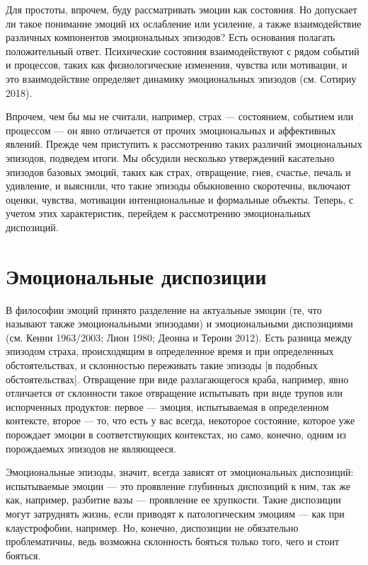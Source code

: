 \documentclass[11pt]{book}
\begin{document}
Для простоты, впрочем, буду рассматривать эмоции как состояния. Но допускает ли такое понимание эмоций их ослабление или усиление, а также взаимодействие различных компонентов эмоциональных эпизодов? Есть основания полагать положительный ответ. Психические состояния взаимодействуют с рядом событий и процессов, таких как физиологические изменения, чувства или мотивации, и это взаимодействие определяет динамику эмоциональных эпизодов (см. Сотириу 2018).

Впрочем, чем бы мы не считали, например, страх --- состоянием, событием или процессом --- он явно отличается от прочих эмоциональных и аффективных явлений. Прежде чем приступить к рассмотрению таких различий эмоциональных эпизодов, подведем итоги. Мы обсудили несколько утверждений касательно эпизодов базовых эмоций, таких как страх, отвращение, гнев, счастье, печаль и удивление, и выяснили, что такие эпизоды обыкновенно скоротечны, включают оценки, чувства, мотивации интенциональные и формальные объекты. Теперь, с учетом этих характеристик, перейдем к рассмотрению эмоциональных диспозиций.

\section{Эмоциональные диспозиции}

В философии эмоций принято разделение на актуальные эмоции (те, что называют также эмоциональными эпизодами) и эмоциональными диспозициями (см. Кенни 1963/2003; Лион 1980; Деонна и Терони 2012). Есть разница между эпизодом страха, происходящим в определенное время и при определенных обстоятельствах, и склонностью переживать такие эпизоды [в подобных обстоятельствах]. Отвращение при виде разлагающегося краба, например, явно отличается от склонности такое отвращение испытывать при виде трупов или испорченных продуктов: первое --- эмоция, испытываемая в определенном контексте, второе --- то, что есть у вас всегда, некоторое состояние, которое уже порождает эмоции в соответствующих контекстах, но само, конечно, одним из порождаемых эпизодов не являющееся.

Эмоциональные эпизоды, значит, всегда зависят от эмоциональных диспозиций: испытываемые эмоции --- это проявление глубинных диспозиций к ним, так же как, например, разбитие вазы --- проявление ее хрупкости. Такие диспозиции могут затруднять жизнь, если приводят к патологическим эмоциям --- как при клаустрофобии, например. Но, конечно, диспозиции не обязательно проблематичны, ведь возможна склонность бояться только того, чего и стоит бояться.
\end{document}

